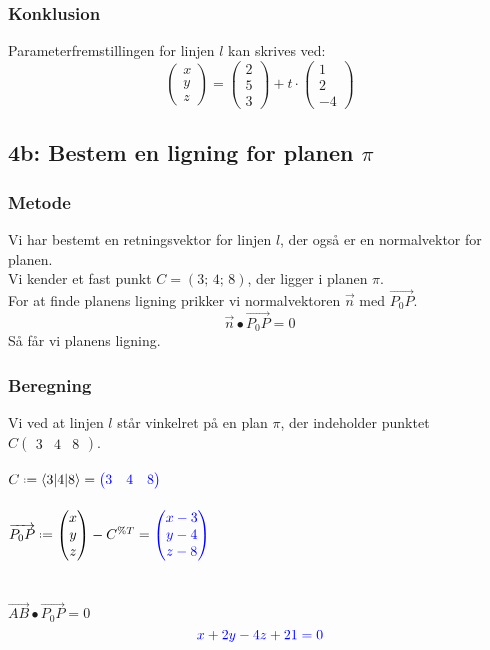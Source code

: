 \documentclass[../main.tex]{subfiles}
\begin{document}
        \subsubsection*{Konklusion}
        Parameterfremstillingen for linjen \(l\) kan skrives ved:
        \[\begin{pmatrix} x \\ y \\ z \end{pmatrix}=\begin{pmatrix} 2 \\ 5 \\ 3 \end{pmatrix} + t \cdot \begin{pmatrix} 1 \\ 2 \\ -4 \end{pmatrix}\]
\clearpage
\subsection*{4b: Bestem en ligning for planen \(\pi\)}
    \subsubsection*{Metode}
        Vi har bestemt en retningsvektor for linjen \(l\), der også er en normalvektor for planen.\\
        Vi kender et fast punkt \(C=(3;\,4;\,8)\), der ligger i planen \(\pi\).\\
        For at finde planens ligning prikker vi normalvektoren \(\overrightarrow{n}\) med \(\overrightarrow{P_0P}\).
        \[\overrightarrow{n} \bullet \overrightarrow{P_0P}=0\]
        Så får vi planens ligning.
    \subsubsection*{Beregning}
        Vi ved at linjen \(l\) står vinkelret på en plan \(\pi\), der indeholder punktet \(C \begin{pmatrix} 3 & 4 & 8 \end{pmatrix}\).\\\\
        \(C \defeq \langle 3|4|8\rangle = \textcolor{blue}{\begin{pmatrix} 3 & 4 & 8 \end{pmatrix}}\)\\\\
        \(\overrightarrow{P_0P} \defeq \begin{pmatrix} x \\ y \\ z\end{pmatrix} - C^{\%T}= \textcolor{blue}{\begin{pmatrix} x-3 \\ y-4 \\ z-8  \end{pmatrix}}\)\\\\\\
        \(\overrightarrow{AB} \bullet \overrightarrow{P_0P}=0\)
        \[\textcolor{blue}{x+2y-4z+21=0}\]
\end{document}
